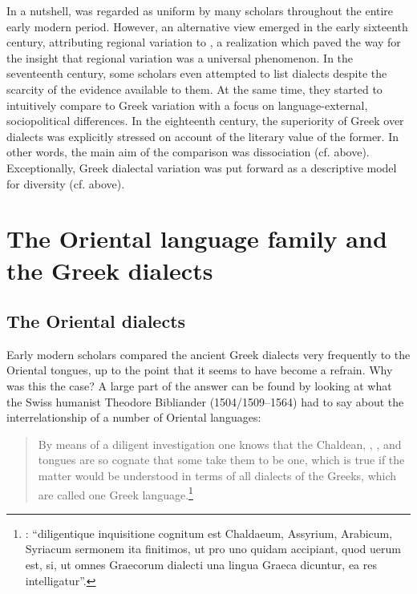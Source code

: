 In a nutshell,  was regarded as uniform by many scholars throughout the entire early modern period. However, an alternative view emerged in the early sixteenth century, attributing regional variation to , a realization which paved the way for the insight that regional variation was a universal phenomenon. In the seventeenth century, some scholars even attempted to list  dialects despite the scarcity of the evidence available to them. At the same time, they started to intuitively compare  to Greek variation with a focus on lan\-guage-ex\-ter\-nal, sociopolitical differences. In the eighteenth century, the superiority of Greek over  dialects was explicitly stressed on account of the literary value of the former. In other words, the main aim of the comparison was dissociation (cf.  above). Exceptionally, Greek dialectal variation was put forward as a descriptive model for  diversity (cf.  above).

\section{The Oriental language family and the Greek dialects}\label{sec:8.3}
\subsection{The Oriental dialects}\label{sec:8.3.1}

Early modern scholars compared the ancient Greek dialects very frequently to the Oriental tongues, up to the point that it seems to have become a refrain. Why was this the case? A large part of the answer can be found by looking at what the Swiss humanist Theodore Bibliander (1504/1509–1564) had to say about the interrelationship of a number of Oriental languages:

\begin{quote}
By means of a diligent investigation one knows that the Chaldean, , , and  tongues are so cognate that some take them to be one, which is true if the matter would be understood in terms of all dialects of the Greeks, which are called one Greek language.\footnote{\citet[58]{Bibliander1542}: “diligentique inquisitione cognitum est Chaldaeum, Assyrium, Arabicum, Syriacum sermonem ita finitimos, ut pro uno quidam accipiant, quod uerum est, si, ut omnes Graecorum dialecti una lingua Graeca dicuntur, ea res intelligatur”.}
\end{quote}

